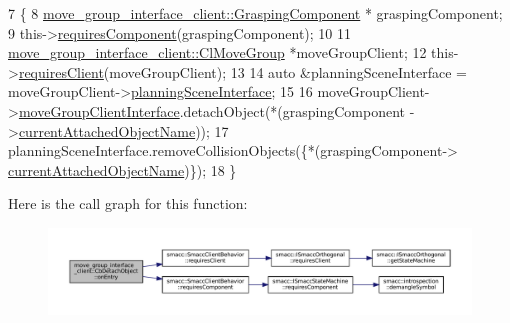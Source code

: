 \begin{DoxyCode}
7     \{
8         \hyperlink{classmove__group__interface__client_1_1GraspingComponent}{move\_group\_interface\_client::GraspingComponent} *
      graspingComponent;
9         this->\hyperlink{classsmacc_1_1SmaccClientBehavior_adee6abe3a28aa6b47d3dd5267e264b4d}{requiresComponent}(graspingComponent);
10 
11         \hyperlink{classmove__group__interface__client_1_1ClMoveGroup}{move\_group\_interface\_client::ClMoveGroup} *moveGroupClient;
12         this->\hyperlink{classsmacc_1_1SmaccClientBehavior_a917f001e763a1059af337bf4e164f542}{requiresClient}(moveGroupClient);
13 
14         \textcolor{keyword}{auto} &planningSceneInterface = moveGroupClient->\hyperlink{classmove__group__interface__client_1_1ClMoveGroup_a401213ca52233581d2a659dbb772720c}{planningSceneInterface};
15 
16         moveGroupClient->\hyperlink{classmove__group__interface__client_1_1ClMoveGroup_a5f0ea9b52695661b17605691168d1f31}{moveGroupClientInterface}.detachObject(*(graspingComponent
      ->\hyperlink{classmove__group__interface__client_1_1GraspingComponent_aa1098467cb6a739228c3ed1a3f66c095}{currentAttachedObjectName}));
17         planningSceneInterface.removeCollisionObjects(\{*(graspingComponent->
      \hyperlink{classmove__group__interface__client_1_1GraspingComponent_aa1098467cb6a739228c3ed1a3f66c095}{currentAttachedObjectName})\});
18     \}
\end{DoxyCode}
Here is the call graph for this function\+:
\nopagebreak
\begin{figure}[H]
\begin{center}
\leavevmode
\includegraphics[width=350pt]{classmove__group__interface__client_1_1CbDetachObject_aaed049b8c346b38a82acb4641aa90df6_cgraph}
\end{center}
\end{figure}
\mbox{\label{classmove__group__interface__client_1_1CbDetachObject_a43c672ede95c7dc49f98b5b7b623c43f}} 
